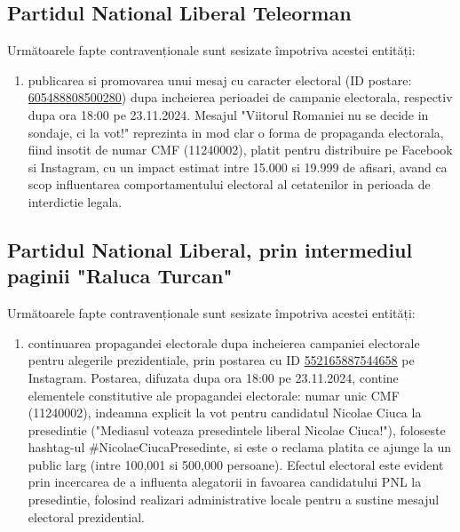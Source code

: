 \documentclass[a4paper,12pt]{article}
\begin{document}
\vspace{0.5cm}

\subsection{Partidul National Liberal Teleorman}
Următoarele fapte contravenționale sunt sesizate împotriva acestei entități:

\begin{enumerate}[leftmargin=*, label=\arabic*.)]
    \item publicarea si promovarea unui mesaj cu caracter electoral (ID postare: \href{https://www.facebook.com/ads/library/?id=605488808500280}{605488808500280}) dupa incheierea perioadei de campanie electorala, respectiv dupa ora 18:00 pe 23.11.2024. Mesajul "Viitorul Romaniei nu se decide in sondaje, ci la vot!" reprezinta in mod clar o forma de propaganda electorala, fiind insotit de numar CMF (11240002), platit pentru distribuire pe Facebook si Instagram, cu un impact estimat intre 15.000 si 19.999 de afisari, avand ca scop influentarea comportamentului electoral al cetatenilor in perioada de interdictie legala.
\end{enumerate}

\vspace{0.5cm}

\subsection{Partidul National Liberal, prin intermediul paginii "Raluca Turcan"}
Următoarele fapte contravenționale sunt sesizate împotriva acestei entități:

\begin{enumerate}[leftmargin=*, label=\arabic*.)]
    \item continuarea propagandei electorale dupa incheierea campaniei electorale pentru alegerile prezidentiale, prin postarea cu ID \href{https://www.facebook.com/ads/library/?id=552165887544658}{552165887544658} pe Instagram. Postarea, difuzata dupa ora 18:00 pe 23.11.2024, contine elementele constitutive ale propagandei electorale: numar unic CMF (11240002), indeamna explicit la vot pentru candidatul Nicolae Ciuca la presedintie ("Mediasul voteaza presedintele liberal Nicolae Ciuca!"), foloseste hashtag-ul \#NicolaeCiucaPresedinte, si este o reclama platita ce ajunge la un public larg (intre 100,001 si 500,000 persoane). Efectul electoral este evident prin incercarea de a influenta alegatorii in favoarea candidatului PNL la presedintie, folosind realizari administrative locale pentru a sustine mesajul electoral prezidential.
\end{enumerate}
\end{document}
